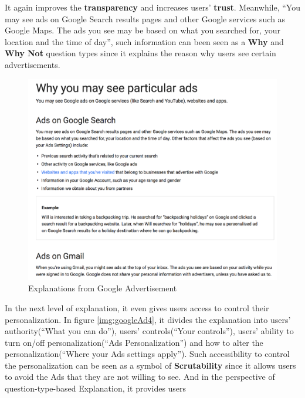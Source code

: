         It again improves the \textbf{transparency} and increases users' \textbf{trust}. 
        Meanwhile, ``You may see ads on Google Search results pages and other Google services such as Google Maps. 
        The ads you see may be based on what you searched for, your location and the time of day'',
        such information can been seen as a \textbf{Why} 
        and \textbf{Why Not} question types since it explains the reason why users see certain advertisements.
        \begin{figure}[H]
            \centering
            \captionsetup{justification=centering}
            \begin{mdframed}
                \includegraphics[width=1\textwidth]{img/googleAd3-1}
            \end{mdframed}
            \caption{Explanations from Google Advertisement\cite{googleAd3}}
            \label{img:googleAd3}
        \end{figure}
        In the next level of explanation, it even gives users access to control their personalization.
        In figure \ref{img:googleAd4}, it divides the explanation into users' authority(``What you can do''), 
        users' controls(``Your controls''), users' ability to turn on/off personalization(``Ads Personalization'')
        and how to alter the personalization(``Where your Ads settings apply''). Such accessibility to control
        the personalization can be seen as a symbol of \textbf{Scrutability} since it allows users to avoid the Ads 
        that they are not willing to see. And in the perspective of question-type-based Explanation, it provides users
